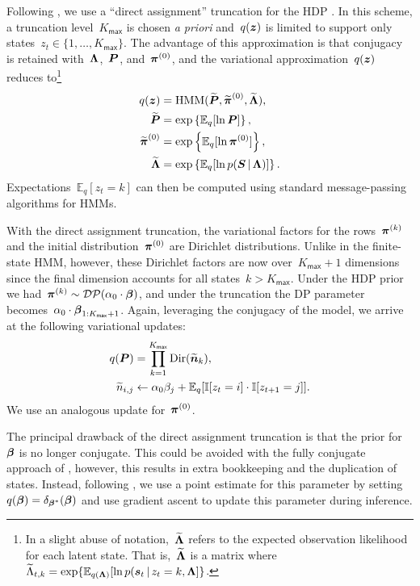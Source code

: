 Following \citep{Johnson14}, we use a ``direct assignment'' truncation
for the HDP \citep{Bryant12, Liang07}. In this scheme, a truncation
level~$K_{\mathsf{max}}$ is chosen {\it a priori} and~$q(\boldsymbol{z})$ is limited to
support only states~${z_t\in\{1,\ldots, K_{\mathsf{max}}\}}$. The advantage of this
approximation is that conjugacy is retained with~$\boldsymbol{\Lambda}$,~$\boldsymbol{P}$,
and~$\boldsymbol{\pi}^{(0)}$, and the variational approximation~$q(\boldsymbol{z})$ reduces
to\footnote{In a slight abuse of notation,~$\widetilde{\boldsymbol{\Lambda}}$ refers
  to the expected observation likelihood for each latent state. That is,~$\widetilde{\boldsymbol{\Lambda}}$ is a matrix where~$\widetilde{\Lambda}_{t,k}=\exp\{\mathbb{E}_{q(\boldsymbol{\Lambda})}[\ln p(\boldsymbol{s}_t \,|\, z_t=k, \boldsymbol{\Lambda}]\}$. }
\begin{align*}
q(\boldsymbol{z}) &= \mathrm{HMM}(\widetilde{\boldsymbol{P}}, \widetilde{\boldsymbol{\pi}}^{(0)}, \widetilde{\boldsymbol{\Lambda}}), \\
\widetilde{\boldsymbol{P}} &= \exp\left\{\mathbb{E}_q[\ln \boldsymbol{P}]\right\}, \\
\widetilde{\boldsymbol{\pi}}^{(0)} &= \exp\left\{\mathbb{E}_q[\ln \boldsymbol{\pi}^{(0)}]\right\}, \\
\widetilde{\boldsymbol{\Lambda}} &= \exp\left\{\mathbb{E}_q[\ln p( \boldsymbol{S} \,|\, \boldsymbol{\Lambda})]\right\}.
\end{align*}
Expectations~${\mathbb{E}_q[z_t=k]}$ can then be computed using
standard message-passing algorithms for HMMs.

With the direct assignment truncation, the variational factors for the
rows~$\boldsymbol{\pi}^{(k)}$ and the initial distribution~$\boldsymbol{\pi}^{(0)}$ are
Dirichlet distributions. Unlike in the finite-state HMM, however,
these Dirichlet factors are now over~${K_{\mathsf{max}}+1}$ dimensions since the final
dimension accounts for all states~${k>K_{\mathsf{max}}}$. Under the HDP prior we
had~${\boldsymbol{\pi}^{(k)} \sim \mathcal{DP}(\alpha_0 \cdot \boldsymbol{\beta})}$, and under the
truncation the DP parameter becomes~$\alpha_0 \cdot
\boldsymbol{\beta}_{1:K_{\mathsf{max}}+1}$.
Again, leveraging the conjugacy of the model, we arrive at the
following variational updates:
\begin{align*}
q(\boldsymbol{P}) &= \prod_{k=1}^{K_{\mathsf{max}}} \mathrm{Dir}(\widetilde{\boldsymbol{n}}_k), \\
\widetilde{n}_{i,j} &\leftarrow \alpha_0 \beta_j + \mathbb{E}_q[\mathbb{I}[z_t=i]\cdot\mathbb{I}[z_{t+1}=j]].
\end{align*}
We use an analogous update for~$\boldsymbol{\pi}^{(0)}$.

The principal drawback of the direct assignment truncation is that the
prior for~$\boldsymbol{\beta}$ is no longer conjugate. This could be avoided with
the fully conjugate approach of \citep{Hoffman-2013}, however, this
results in extra bookkeeping and the duplication of states. Instead,
following \citep{Johnson14, Bryant12, Liang07}, we use a point
estimate for this parameter by setting~${q(\boldsymbol{\beta})=\delta_{\boldsymbol{\beta}^*}}(\boldsymbol{\beta})$
and use gradient ascent to update this
parameter during inference.

